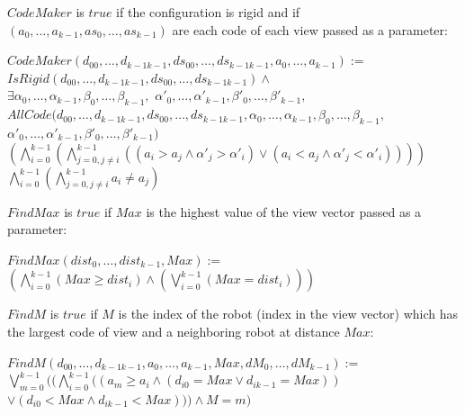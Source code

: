 \documentclass{article}
\begin{document}
$CodeMaker$ is $true$ if the configuration is rigid and if $ (a_{0}, \ldots , a_{k-1}, as_{0}, \ldots , as_{k-1})$ are each code of each view passed as a parameter:

\begin{center}
$CodeMaker (d_{00}, \ldots ,d_{k-1k-1}, ds_{00}, \ldots ,ds_{k-1k-1}, a_{0}, \ldots , a_{k-1}):=$\\
$IsRigid (d_{00}, \ldots ,d_{k-1k-1}, ds_{00}, \ldots ,ds_{k-1k-1}) \land $\\
$\exists \alpha_{0}, \dots, \alpha_{k-1}, \beta_{0}, \dots, \beta_{k-1},$
$\alpha'_{0}, \dots, \alpha'_{k-1}, \beta'_{0}, \dots, \beta'_{k-1},$\\
$AllCode (d_{00}, \ldots ,d_{k-1k-1}, ds_{00}, \ldots ,ds_{k-1k-1}, \alpha_{0}, \dots, \alpha_{k-1}, \beta_{0}, \dots, \beta_{k-1}, $\\
$\alpha'_{0}, \dots, \alpha'_{k-1}, \beta'_{0}, \dots, \beta'_{k-1})$\\
$ (\bigwedge_{i = 0}^{k-1}  (\bigwedge_{j = 0, j\not=i}^{k-1}  ( (a_{i} > a_{j} \land \alpha'_{j} > \alpha'_{i}) \lor  (a_{i} < a_{j} \land \alpha'_{j} < \alpha'_{i}) ) ) )$\\
$\bigwedge_{i=0}^{k-1}  (\bigwedge_{j=0, j \not= i}^{k-1} a_{i} \not= a_{j})$
\end{center}

$FindMax$ is $true$ if $Max$ is the highest value of the view vector passed as a parameter:

\begin{center}

$FindMax (dist_{0}, \ldots ,dist_{k-1}, Max):=$\\
$ (\bigwedge_{i=0}^{k-1}  (Max \geq dist_{i}) \land  (\bigvee_{i=0}^{k-1}  (Max = dist_{i})))$
\end{center}

$FindM$ is $true$ if $M$ is the index of the robot  (index in the view vector) which has the largest code of view and a neighboring robot at distance $Max$:

\begin{center}

$FindM (d_{00}, \ldots ,d_{k-1k-1}, a_{0}, \ldots , a_{k-1}, Max, dM_{0}, \dots, dM_{k-1}):=$\\
$\bigvee_{m=0}^{k-1} ( (\bigwedge_{i=0}^{k-1}  ( (a_{m} \geq a_i \land  (d_{i0} = Max \lor d_{ik-1} = Max))$\\
$\lor  (d_{i0} < Max \land d_{ik-1} < Max))) \land M = m )$
\end{center}
\end{document}

